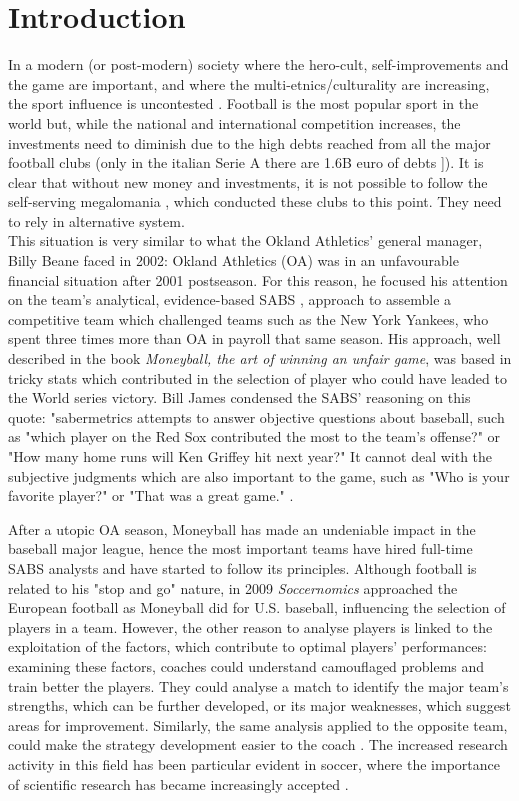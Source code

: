 \documentclass{acm_proc_article-sp-sigmod07}
\begin{document}
\section{Introduction}
In a modern (or post-modern) society where the hero-cult, self-improvements and the game are important, and where the multi-etnics/culturality are increasing, the sport influence is uncontested \cite{pelivs2003sport}.
Football is the most popular sport in the world but, while the national and international competition increases, the investments need to diminish due to the high debts reached from all the major football clubs (only in the italian Serie A there are 1.6B euro of debts \cite{gazzetta}]). It is clear that without new money and investments, it is not possible to follow the self-serving megalomania \cite{progression}, which conducted these clubs to this point. They need to rely in alternative system.\\
This situation is very similar to what the Okland Athletics' general manager, Billy Beane faced in 2002: Okland Athletics (OA) was in an unfavourable financial situation after 2001 postseason. For this reason, he focused his attention on the team’s analytical, evidence-based SABS \cite{grabiner1999sabermetric}, approach to assemble a competitive team which challenged teams such as the New York Yankees, who spent three times more than OA in payroll that same season. His approach, well described in the book \emph{Moneyball, the art of winning an unfair game}, was based in tricky stats which contributed in the selection of player who could have leaded to the World series victory. Bill James condensed the SABS' reasoning on this quote: "sabermetrics attempts to answer objective questions about baseball, such as "which player on the Red Sox contributed the most to the team's offense?" or "How many home runs will Ken Griffey hit next year?" It cannot deal with the subjective judgments which are also important to the game, such as "Who is your favorite player?" or "That was a great game." \cite{grabiner1999sabermetric}.

After a utopic OA season, Moneyball has made an undeniable impact in the baseball major league, hence the most important teams have hired full-time SABS analysts and have started to follow its principles. Although football is related to his "stop and go" nature, in 2009 \emph{Soccernomics} approached the European football as Moneyball did for U.S. baseball, influencing the selection of players in a team.
However, the other reason to analyse players is linked to the exploitation of the factors, which contribute to optimal players' performances: examining these factors, coaches could understand camouflaged problems and train better the players. They could analyse a match to identify the major team's strengths, which can be further developed, or its major weaknesses, which suggest areas for improvement. Similarly, the same analysis applied to the opposite team, could make the strategy development easier to the coach \cite{lago2010game}. The increased research activity in this field has been particular evident in soccer, where the importance of scientific research has became increasingly accepted \cite{ScienceSoccer}.
\end{document}
